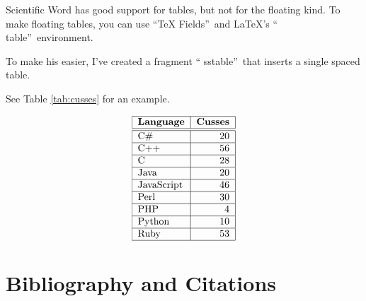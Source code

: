 Scientific Word has good support for tables, but not for the floating kind.
To make floating tables, you can use \textquotedblleft TeX
Fields\textquotedblright\ and LaTeX's \textquotedblleft
table\textquotedblright\ environment.

To make his easier, I've created a fragment \textquotedblleft
sstable\textquotedblright\ that inserts a single spaced table.

See Table \ref{tab:cusses} for an example.

\begin{table}[tb]%
\begin{singlespaced}%

\begin{equation*}
\begin{tabular}{|l|r|}
\hline
\textbf{Language} & \textbf{Cusses} \\ \hline\hline
C\# & 20 \\ \hline
C++ & 56 \\ \hline
C & 28 \\ \hline
Java & 20 \\ \hline
JavaScript & 46 \\ \hline
Perl & 30 \\ \hline
PHP & 4 \\ \hline
Python & 10 \\ \hline
Ruby & 53 \\ \hline
\end{tabular}%
\end{equation*}%
\end{singlespaced}%
\caption{Cuss count by programming language.}%
\label{tab:cusses}%
\end{table}%

\section{Bibliography and Citations}

